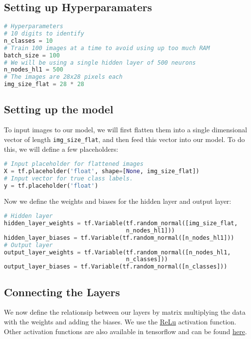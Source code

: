 \documentclass[Proceedings]{ascelike}
\begin{document}
\subsection{Setting up Hyperparamaters}
\begin{lstlisting}[language=Python]
# Hyperparameters
# 10 digits to identify
n_classes = 10
# Train 100 images at a time to avoid using up too much RAM
batch_size = 100
# We will be using a single hidden layer of 500 neurons
n_nodes_hl1 = 500
# The images are 28x28 pixels each
img_size_flat = 28 * 28
\end{lstlisting}

\subsection{Setting up the model}
To input images to our model, we will first flatten them into a single dimensional vector of length \texttt{img\_size\_flat}, and then feed this vector into our model. To do this, we will define a few placeholders:

\begin{lstlisting}[language=Python]
# Input placeholder for flattened images
X = tf.placeholder('float', shape=[None, img_size_flat])
# Input vector for true class labels.
y = tf.placeholder('float')
\end{lstlisting}

Now we define the weights and biases for the hidden layer and output layer:

\begin{lstlisting}[language=Python]
# Hidden layer
hidden_layer_weights = tf.Variable(tf.random_normal([img_size_flat, 
                                   n_nodes_hl1]))
hidden_layer_biases = tf.Variable(tf.random_normal([n_nodes_hl1]))
# Output layer
output_layer_weights = tf.Variable(tf.random_normal([n_nodes_hl1,
                                   n_classes]))
output_layer_biases = tf.Variable(tf.random_normal([n_classes]))
\end{lstlisting}

\subsection{Connecting the Layers}
We now define the relationsip between our layers by matrix multiplying the data with the weights and adding the biases. We use the \href{https://en.wikipedia.org/wiki/Rectifier_(neural_networks)}{ReLu} activation function. Other activation functions are also available in tensorflow and can be found \href{https://www.tensorflow.org/api_guides/python/nn}{here}.
\end{document}
